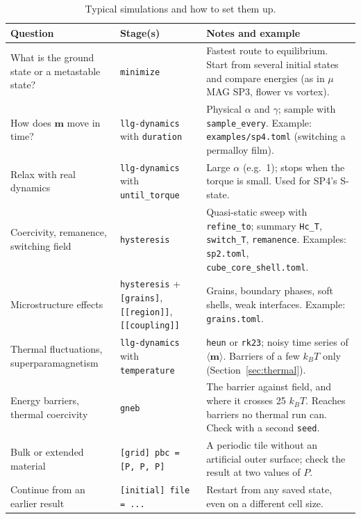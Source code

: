 \documentclass[10pt,a4paper]{article}
\newcommand{\code}[1]{\texttt{#1}}
\newcommand{\vm}{\mathbf{m}}
\begin{document}
\begin{table}[h]
\centering\small
\caption{Typical simulations and how to set them up.}
\label{tab:sims}
\begin{tabularx}{\textwidth}{@{}>{\raggedright\arraybackslash}p{3.6cm} >{\raggedright\arraybackslash}p{3.3cm} Y@{}}
\toprule
Question & Stage(s) & Notes and example \\
\midrule
What is the ground state or a metastable state? & \code{minimize} & Fastest route to equilibrium. Start from several initial
  states and compare energies (as in $\mu$MAG SP3, flower vs vortex). \\
How does $\vm$ move in time? & \code{llg-dynamics} with \code{duration} & Physical $\alpha$ and $\gamma$; sample with
  \code{sample\_every}. Example: \code{examples/sp4.toml} (switching a permalloy film). \\
Relax with real dynamics & \code{llg-dynamics} with \code{until\_torque} & Large $\alpha$ (e.g.\ 1); stops when the
  torque is small. Used for SP4's S-state. \\
Coercivity, remanence, switching field & \code{hysteresis} & Quasi-static sweep with \code{refine\_to}; summary
  \code{Hc\_T}, \code{switch\_T}, \code{remanence}. Examples: \code{sp2.toml}, \code{cube\_core\_shell.toml}. \\
Microstructure effects & \code{hysteresis} + \code{[grains]}, \code{[[region]]}, \code{[[coupling]]} & Grains, boundary
  phases, soft shells, weak interfaces. Example: \code{grains.toml}. \\
Thermal fluctuations, superparamagnetism & \code{llg-dynamics} with \code{temperature} & \code{heun} or \code{rk23};
  noisy time series of $\langle\vm\rangle$. Barriers of a few $k_BT$ only (Section~\ref{sec:thermal}). \\
Energy barriers, thermal coercivity & \code{gneb} & The barrier against field, and where it crosses 25 $k_BT$. Reaches
  barriers no thermal run can. Check with a second \code{seed}. \\
Bulk or extended material & \code{[grid] pbc = [P, P, P]} & A periodic tile without an artificial outer surface;
  check the result at two values of $P$. \\
Continue from an earlier result & \code{[initial] file = ...} & Restart from any saved state, even on a different cell
  size. \\
\bottomrule
\end{tabularx}
\end{table}
\end{document}
